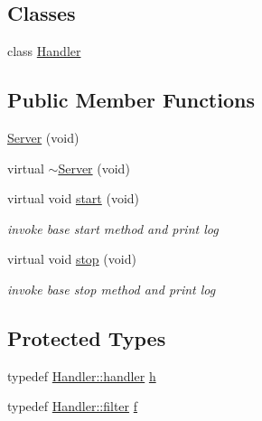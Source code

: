 \subsection*{Classes}
\begin{DoxyCompactItemize}
\item 
class \hyperlink{classxtd_1_1network_1_1http_1_1Server_1_1Handler}{Handler}
\end{DoxyCompactItemize}
\subsection*{Public Member Functions}
\begin{DoxyCompactItemize}
\item 
\hyperlink{classxtd_1_1network_1_1http_1_1Server_a15132ec2b08249a3dc54c9d228620ee5}{Server} (void)
\item 
virtual \hyperlink{classxtd_1_1network_1_1http_1_1Server_a85da5acf9ddab934f5cddb330eae9f99}{$\sim$\+Server} (void)
\item 
virtual void \hyperlink{classxtd_1_1network_1_1http_1_1Server_a8f2c0ce0dd0d150d74d3cfd89edb9332}{start} (void)
\begin{DoxyCompactList}\small\item\em invoke base start method and print log \end{DoxyCompactList}\item 
virtual void \hyperlink{classxtd_1_1network_1_1http_1_1Server_a8683467193d33cef96950fad43b8f47c}{stop} (void)
\begin{DoxyCompactList}\small\item\em invoke base stop method and print log \end{DoxyCompactList}\end{DoxyCompactItemize}
\subsection*{Protected Types}
\begin{DoxyCompactItemize}
\item 
typedef \hyperlink{structxtd_1_1network_1_1http_1_1Server_1_1Handler_1_1handler}{Handler\+::handler} \hyperlink{classxtd_1_1network_1_1http_1_1Server_af55090adba952bd4ddcd6eb467974ac8}{h}
\item 
typedef \hyperlink{structxtd_1_1network_1_1http_1_1Server_1_1Handler_1_1filter}{Handler\+::filter} \hyperlink{classxtd_1_1network_1_1http_1_1Server_a94d4867ec740265b62b7505584387240}{f}
\end{DoxyCompactItemize}

